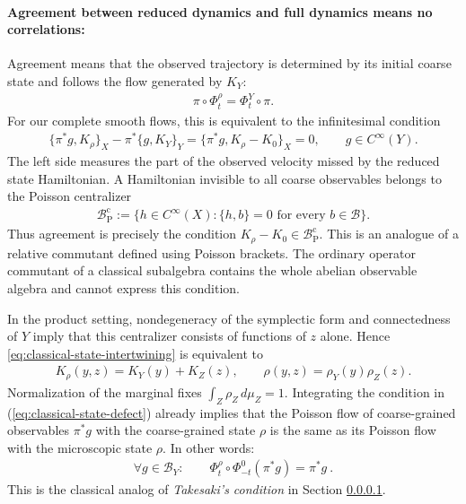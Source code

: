 \documentclass[a4paper,11pt]{article}
\theoremstyle{definition}
\newcommand{\mB}{\mathcal{B}}
\begin{document}
\paragraph{Agreement between reduced dynamics and full dynamics means no correlations:}
Agreement means that the observed trajectory is determined by its initial coarse state and follows the flow generated by $K_Y$:
\begin{align}\label{eq:classical-state-intertwining}
    \pi\circ\Phi_t^\rho=\Phi_t^Y\circ\pi.
\end{align}
For our complete smooth flows, this is equivalent to the infinitesimal condition
\begin{align}\label{eq:classical-state-defect}
    \{\pi^*g,K_\rho\}_X-\pi^*\{g,K_Y\}_Y
    =\{\pi^*g,K_\rho-K_0\}_X=0,
    \qquad g\in C^\infty(Y).
\end{align}
The left side measures the part of the observed velocity missed by the reduced state Hamiltonian. A Hamiltonian invisible to all coarse observables belongs to the Poisson centralizer
\begin{align}
    \mathcal B^{\mathrm c}_{\mathrm P}
    :=\{h\in C^\infty(X):\{h,b\}=0\text{ for every }b\in\mathcal B\}.
\end{align}
Thus agreement is precisely the condition $K_\rho-K_0\in\mathcal B^{\mathrm c}_{\mathrm P}$. This is an analogue of a relative commutant defined using Poisson brackets. The ordinary operator commutant of a classical subalgebra contains the whole abelian observable algebra and cannot express this condition.

In the product setting, nondegeneracy of the symplectic form and connectedness of $Y$ imply that this centralizer consists of functions of $z$ alone. Hence \eqref{eq:classical-state-intertwining} is equivalent to
\begin{align}\label{eq:classical-product-state-closure}
    K_\rho(y,z)=K_Y(y)+K_Z(z),
    \qquad
    \rho(y,z)=\rho_Y(y)\rho_Z(z).
\end{align}
Normalization of the marginal fixes $\int_Z\rho_Z\,d\mu_Z=1$. Integrating the condition in (\ref{eq:classical-state-defect}) already implies that the Poisson flow of coarse-grained observables $\pi^*g$ with the coarse-grained state $\rho$ is the same as its Poisson flow with the microscopic state $\rho$. In other words:
\begin{align}
    \forall g\in \mB_Y:\qquad \Phi^\rho_t\circ \Phi_{-t}^0(\pi^*g)=\pi^*g\ .
\end{align}
This is the classical analog of {\it Takesaki's condition} in Section \ref{}.
\end{document}
